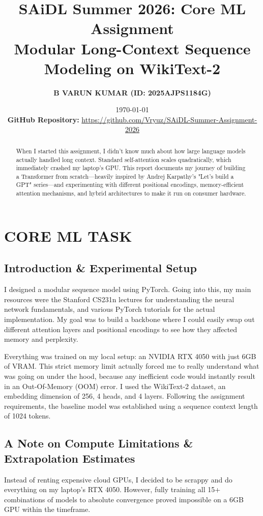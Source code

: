 \documentclass[11pt,a4paper]{article}
\title{\textbf{SAiDL Summer 2026: Core ML Assignment \\ Modular Long-Context Sequence Modeling on WikiText-2}}
\author{\textbf{B VARUN KUMAR (ID: 2025AJPS1184G)}}
\date{\today \\ \vspace{0.5em} \textbf{GitHub Repository:} \url{https://github.com/Vryuz/SAiDL-Summer-Assignment-2026}}
\begin{document}
\maketitle

\begin{abstract}
When I started this assignment, I didn't know much about how large language models actually handled long context. Standard self-attention scales quadratically, which immediately crashed my laptop's GPU. This report documents my journey of building a Transformer from scratch---heavily inspired by Andrej Karpathy's "Let's build a GPT" series---and experimenting with different positional encodings, memory-efficient attention mechanisms, and hybrid architectures to make it run on consumer hardware.
\end{abstract}

\renewcommand{\thesection}{\arabic{section})}
\renewcommand{\thesubsection}{\arabic{section})\alph{subsection}}
\renewcommand{\thesubsubsection}{\arabic{section})\alph{subsection}.\roman{subsubsection}}

\section{CORE ML TASK}

\subsection{Introduction \& Experimental Setup}
I designed a modular sequence model using PyTorch. Going into this, my main resources were the Stanford CS231n lectures for understanding the neural network fundamentals, and various PyTorch tutorials for the actual implementation. My goal was to build a backbone where I could easily swap out different attention layers and positional encodings to see how they affected memory and perplexity. 

Everything was trained on my local setup: an NVIDIA RTX 4050 with just 6GB of VRAM. This strict memory limit actually forced me to really understand what was going on under the hood, because any inefficient code would instantly result in an Out-Of-Memory (OOM) error. I used the WikiText-2 dataset, an embedding dimension of 256, 4 heads, and 4 layers. Following the assignment requirements, the baseline model was established using a sequence context length of 1024 tokens.

\subsection{A Note on Compute Limitations \& Extrapolation Estimates}
Instead of renting expensive cloud GPUs, I decided to be scrappy and do everything on my laptop's RTX 4050. However, fully training all 15+ combinations of models to absolute convergence proved impossible on a 6GB GPU within the timeframe. 
\end{document}
